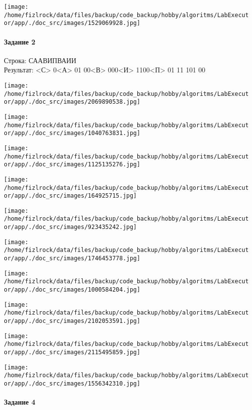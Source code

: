 \documentclass[a4paper, 12pt]{article}
\begin{document}
\texttt{[image: /home/fizlrock/data/files/backup/code\_backup/hobby/algoritms/LabExecutor/app/./doc\_src/images/1529069928.jpg]}
\pagebreak
\paragraph{Задание 2}

Строка: 
СААВИПВАИИ\\
Результат: <С> 0<А> 01 00<В> 000<И> 1100<П> 01 11 101 00

\texttt{[image: /home/fizlrock/data/files/backup/code\_backup/hobby/algoritms/LabExecutor/app/./doc\_src/images/2069890538.jpg]}

\texttt{[image: /home/fizlrock/data/files/backup/code\_backup/hobby/algoritms/LabExecutor/app/./doc\_src/images/1040763831.jpg]}

\texttt{[image: /home/fizlrock/data/files/backup/code\_backup/hobby/algoritms/LabExecutor/app/./doc\_src/images/1125135276.jpg]}

\texttt{[image: /home/fizlrock/data/files/backup/code\_backup/hobby/algoritms/LabExecutor/app/./doc\_src/images/164925715.jpg]}

\texttt{[image: /home/fizlrock/data/files/backup/code\_backup/hobby/algoritms/LabExecutor/app/./doc\_src/images/923435242.jpg]}

\texttt{[image: /home/fizlrock/data/files/backup/code\_backup/hobby/algoritms/LabExecutor/app/./doc\_src/images/1746453778.jpg]}

\texttt{[image: /home/fizlrock/data/files/backup/code\_backup/hobby/algoritms/LabExecutor/app/./doc\_src/images/1000584204.jpg]}

\texttt{[image: /home/fizlrock/data/files/backup/code\_backup/hobby/algoritms/LabExecutor/app/./doc\_src/images/2102053591.jpg]}

\texttt{[image: /home/fizlrock/data/files/backup/code\_backup/hobby/algoritms/LabExecutor/app/./doc\_src/images/2115495859.jpg]}

\texttt{[image: /home/fizlrock/data/files/backup/code\_backup/hobby/algoritms/LabExecutor/app/./doc\_src/images/1556342310.jpg]}
\pagebreak
\paragraph{Задание 4}
\end{document}
